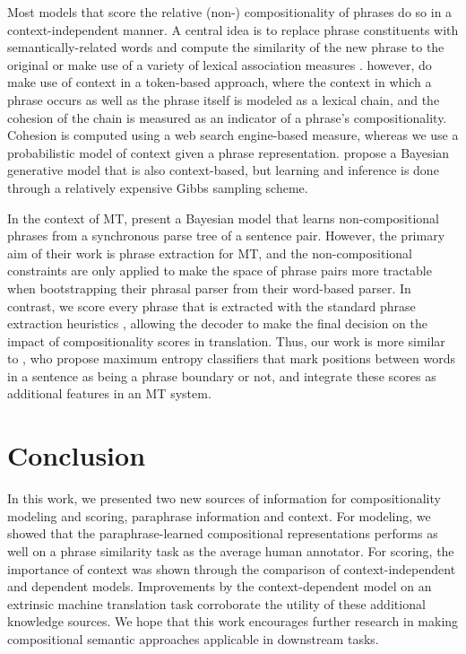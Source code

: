 \documentclass[11pt]{article}
\begin{document}
Most models that score the relative (non-) compositionality of phrases do so in a context-independent manner. 
A central idea is to replace phrase constituents with semantically-related words and compute the similarity of the new phrase to the original \cite{Kiela2013,Salehi2014} or make use of a variety of lexical association measures \cite{Lin1999,Pecina2006}. 
 however, do make use of context in a token-based approach, where the context in which a phrase occurs as well as the phrase itself is modeled as a lexical chain, and the cohesion of the chain is measured as an indicator of a phrase's compositionality. 
Cohesion is computed using a web search engine-based measure, whereas we use a probabilistic model of context given a phrase representation. 
 propose a Bayesian generative model that is also context-based, but learning and inference is done through a relatively expensive Gibbs sampling scheme.  

In the context of MT,  present a Bayesian model that learns non-compositional phrases from a synchronous parse tree of a sentence pair.
However, the primary aim of their work is phrase extraction for MT, and the non-compositional constraints are only applied to make the space of phrase pairs more tractable when bootstrapping their phrasal parser from their word-based parser. 
In contrast, we score every phrase that is extracted with the standard phrase extraction heuristics \cite{Chiang2007}, allowing the decoder to make the final decision on the impact of compositionality scores in translation. 
Thus, our work is more similar to , who propose maximum entropy classifiers that mark positions between words in a sentence as being a phrase boundary or not, and integrate these scores as additional features in an MT system.  

\section{Conclusion}

In this work, we presented two new sources of information for compositionality modeling and scoring, paraphrase information and context. 
For modeling, we showed that the paraphrase-learned compositional representations performs as well on a phrase similarity task as the average human annotator.
For scoring, the importance of context was shown through the comparison of context-independent and dependent models. 
Improvements by the context-dependent model on an extrinsic machine translation task corroborate the utility of these additional knowledge sources. 
We hope that this work encourages further research in making compositional semantic approaches applicable in downstream tasks. 



\end{document}
